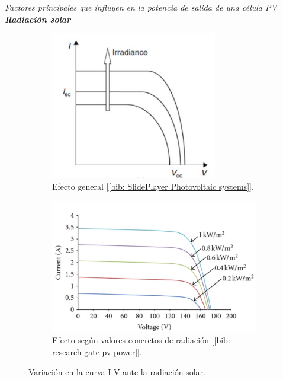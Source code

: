 \documentclass[12pt]{article}
\begin{document}
	\noindent \textit{Factores principales que influyen en la potencia de salida de una célula PV}\\
	
	\noindent \textit{\textbf{Radiación solar}}
	\begin{figure}[h]
		\begin{subfigure}{0.45\textwidth}
			\includegraphics[width=0.8\textwidth]{img/generalEffect_irradianceIVcurve_solarCell.png} 
			\caption{Efecto general [\ref{bib: SlidePlayer Photovoltaic systems}].}
			\label{fig: variación general en la curva I-V de una célula PV con la intensidad de la radiación solar.}
		\end{subfigure}
		\begin{subfigure}{0.5\textwidth}
			\includegraphics[width=1.05\linewidth]{img/concreteEffect_irradianceIVcurve_solarCell.png}
			\caption{Efecto según valores concretos de radiación [\ref{bib: research gate pv power}].}
			\label{fig:variación con valores en la curva I-V de una célula PV con la intensidad de la radiación solar.}
		\end{subfigure}
		\caption{Variación en la curva I-V ante la radiación solar.}
		\label{fig:variación I-V radiación solar}
	\end{figure}
	
\end{document}
